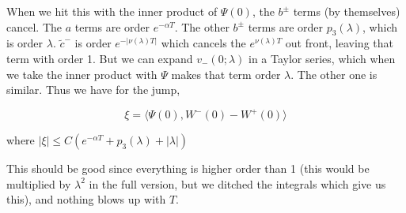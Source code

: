 \documentclass[12pt]{article}
\begin{document}
\begin{enumerate}
When we hit this with the inner product of $\Psi(0)$, the $b^\pm$ terms (by themselves) cancel. The $a$ terms are order $e^{-\alpha T}$. The other $b^\pm$ terms are order $p_3(\lambda)$, which is order $\lambda$. $\tilde{c}^-$ is order $e^{-|\nu(\lambda)T|}$ which cancels the $e^{\nu(\lambda)T}$ out front, leaving that term with order 1. But we can expand $v_-(0; \lambda)$ in a Taylor series, which when we take the inner product with $\Psi$ makes that term order $\lambda$. The other one is similar. Thus we have for the jump,

\[
\xi = \langle \Psi(0), W^-(0) - W^+(0) \rangle
\]

where $|\xi| \leq C( e^{-\alpha T} + p_3(\lambda) + |\lambda| )$

This should be good since everything is higher order than 1 (this would be multiplied by $\lambda^2$ in the full version, but we ditched the integrals which give us this), and nothing blows up with $T$.


\end{enumerate}
\end{document}

